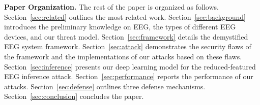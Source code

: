 \indent \textbf{Paper Organization.} The rest of the paper is organized as follows. Section~\ref{sec:related} outlines the most related work. Section~\ref{sec:background} introduces the preliminary knowledge on EEG, the types of different EEG devices, and our threat model. Section~\ref{sec:framework} details the demystified EEG system framework. Section~\ref{sec:attack} demonstrates the security flaws of the framework and the implementations of our attacks based on these flaws. Section~\ref{sec:inference} presents our deep learning model for the reduced-featured EEG inference attack. Section~\ref{sec:performance} reports the performance of our attacks. Section~\ref{sec:defense} outlines three defense mechanisms. Section~\ref{sec:conclusion} concludes the paper.


